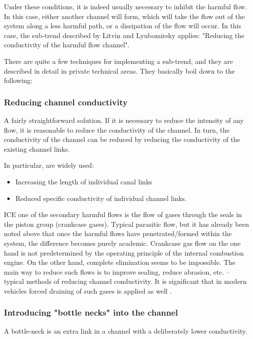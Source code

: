 \documentclass[a4paper,11pt]{article}
\begin{document}
Under these conditions, it is indeed usually necessary to inhibit the harmful
flow. In this case, either another channel will form, which will take the flow
out of the system along a less harmful path, or a dissipation of the flow will
occur. In this case, the sub-trend described by Litvin and Lyubomirsky
applies: "Reducing the conductivity of the harmful flow channel".

There are quite a few techniques for implementing a sub-trend, and they are
described in detail in private technical areas. They basically boil down to
the following:

\subsubsection{Reducing channel conductivity}

A fairly straightforward solution. If it is necessary to reduce the intensity
of any flow, it is reasonable to reduce the conductivity of the channel. In
turn, the conductivity of the channel can be reduced by reducing the
conductivity of the existing channel links.

In particular, are widely used:
\begin{itemize}
\item Increasing the length of individual canal links
\item Reduced specific conductivity of individual channel links.
\end{itemize}
ICE one of the secondary harmful flows is the flow of gases through the seals
in the piston group (crankcase gases). Typical parasitic flow, but it has
already been noted above that once the harmful flows have penetrated/formed
within the system, the difference becomes purely academic. Crankcase gas flow
on the one hand is not predetermined by the operating principle of the
internal combustion engine. On the other hand, complete elimination seems to
be impossible. The main way to reduce such flows is to improve sealing, reduce
abrasion, etc. -- typical methods of reducing channel conductivity. It is
significant that in modern vehicles forced draining of such gases is applied
as well \cite{B19}.

\subsubsection{Introducing "bottle necks" into the channel}

A bottle-neck is an extra link in a channel with a deliberately lower
conductivity.
\end{document}
